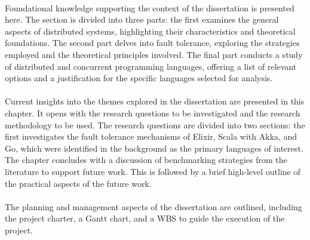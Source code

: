 \paragraph{} Foundational knowledge supporting the context of the dissertation is presented here. The section is divided into three parts: the first examines the general aspects of distributed systems, highlighting their characteristics and theoretical foundations. The second part delves into fault tolerance, exploring the strategies employed and the theoretical principles involved. The final part conducts a study of distributed and concurrent programming languages, offering a list of relevant options and a justification for the specific languages selected for analysis.

\paragraph{} Current insights into the themes explored in the dissertation are presented in this chapter. It opens with the research questions to be investigated and the research methodology to be used. The research questions are divided into two sections: the first investigates the fault tolerance mechanisms of Elixir, Scala with Akka, and Go, which were identified in the background as the primary languages of interest. The chapter concludes with a discussion of benchmarking strategies from the literature to support future work. This is followed by a brief high-level outline of the practical aspects of the future work. 

\paragraph{} The planning and management aspects of the dissertation are outlined, including the project charter, a Gantt chart, and a \gls{WBS} to guide the execution of the project.